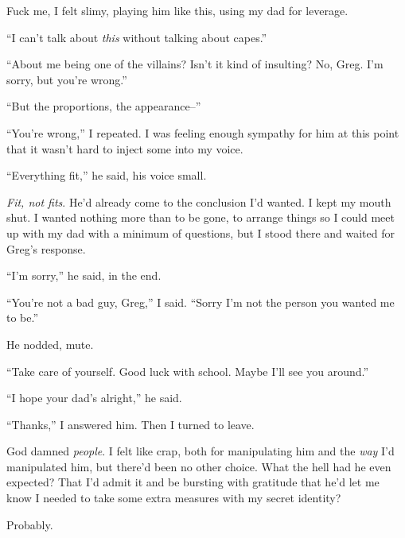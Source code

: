 Fuck me, I felt slimy, playing him like this, using my dad for leverage.



``I can't talk about \emph{this} without talking about capes.''



``About me being one of the villains?  Isn't it kind of insulting?  No, Greg.  I'm sorry, but you're wrong.''



``But the proportions, the appearance--''



``You're wrong,'' I repeated.  I was feeling enough sympathy for him at this point that it wasn't hard to inject some into my voice.



``Everything fit,'' he said, his voice small.



\emph{Fit, not fits}.  He'd already come to the conclusion I'd wanted.  I kept my mouth shut.  I wanted nothing more than to be gone, to arrange things so I could meet up with my dad with a minimum of questions, but I stood there and waited for Greg's response.



``I'm sorry,'' he said, in the end.



``You're not a bad guy, Greg,'' I said.  ``Sorry I'm not the person you wanted me to be.''



He nodded, mute.



``Take care of yourself.  Good luck with school.  Maybe I'll see you around.''



``I hope your dad's alright,'' he said.



``Thanks,'' I answered him.  Then I turned to leave.



God damned \emph{people}.  I felt like crap, both for manipulating him and the \emph{way} I'd manipulated him, but there'd been no other choice.  What the hell had he even expected?  That I'd admit it and be bursting with gratitude that he'd let me know I needed to take some extra measures with my secret identity?



Probably.




